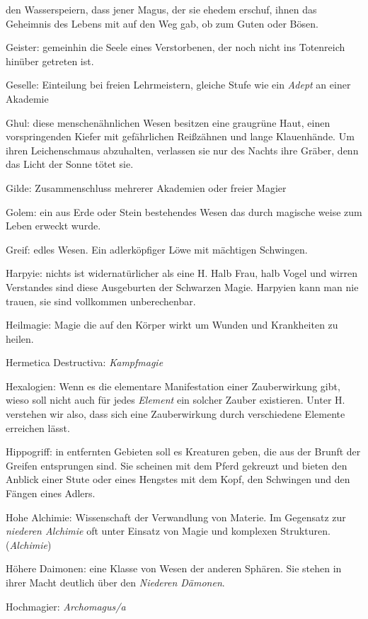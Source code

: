 \documentclass[a5paper,8pt]{book}
\begin{document}
\begin{small}
\begin{description}
den Wasserspeiern, dass jener Magus, der sie ehedem erschuf, ihnen das Geheimnis des Lebens mit auf den Weg gab, ob zum Guten oder Bösen.
 \item Geister: gemeinhin die Seele eines Verstorbenen, der noch nicht ins Totenreich hinüber getreten ist.
 \item Geselle: Einteilung bei freien Lehrmeistern, gleiche Stufe wie ein \textit{Adept} an einer Akademie
 \item Ghul: diese menschenähnlichen Wesen besitzen eine graugrüne Haut, einen vorspringenden Kiefer mit gefährlichen Reißzähnen und lange Klauenhände. Um ihren 
Leichenschmaus abzuhalten, verlassen sie nur des Nachts ihre Gräber, denn das Licht der Sonne tötet sie.
 \item Gilde: Zusammenschluss mehrerer Akademien oder freier Magier
 \item Golem: ein aus Erde oder Stein bestehendes Wesen das durch magische weise zum Leben erweckt wurde.
 \item Greif: edles Wesen. Ein adlerköpfiger Löwe mit mächtigen Schwingen.
 \item Harpyie: nichts ist widernatürlicher als eine H. Halb Frau, halb Vogel und wirren Verstandes sind diese Ausgeburten der Schwarzen Magie. Harpyien kann man nie trauen, 
sie sind vollkommen unberechenbar.
 \item Heilmagie: Magie die auf den Körper wirkt um Wunden und Krankheiten zu heilen.
 \item Hermetica Destructiva: \textit{Kampfmagie}
 \item Hexalogien: Wenn es die elementare Manifestation einer Zauberwirkung gibt, wieso soll nicht auch für jedes \textit{Element} ein solcher Zauber existieren. Unter H. 
verstehen wir also, dass sich eine Zauberwirkung durch verschiedene Elemente erreichen lässt.
 \item Hippogriff: in entfernten Gebieten soll es Kreaturen geben, die aus der Brunft der Greifen entsprungen sind. Sie scheinen mit dem Pferd gekreuzt und bieten den 
Anblick einer Stute oder eines Hengstes mit dem Kopf, den Schwingen und den Fängen eines Adlers.
 \item Hohe Alchimie: Wissenschaft der Verwandlung von Materie. Im Gegensatz zur \textit{niederen Alchimie} oft unter Einsatz von Magie und komplexen Strukturen.
(\textit{Alchimie})
 \item Höhere Daimonen: eine Klasse von Wesen der anderen Sphären. Sie stehen in ihrer Macht deutlich über den \textit{Niederen Dämonen}.
 \item Hochmagier: \textit{Archomagus/a}

\end{description}
\end{small}
\end{document}
